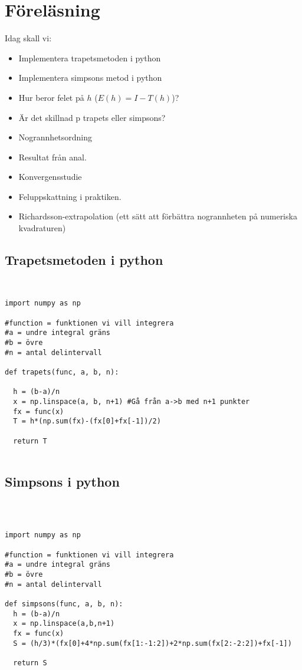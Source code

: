 \section{Föreläsning}

\noindent Idag skall vi:

\begin{itemize}
  \item Implementera trapetsmetoden i python
  \item Implementera simpsons metod i python
  \item Hur beror felet på $h$ ($E(h)=I-T(h)$)?
  \item Är det skillnad p trapets eller simpsons?
  \item Nogrannhetsordning
  \item Resultat från anal.
  \item Konvergensstudie
  \item Feluppskattning i praktiken.
  \item Richardsson-extrapolation (ett sätt att förbättra nogrannheten på numeriska kvadraturen)
\end{itemize}

\subsection{Trapetsmetoden i python}\hfill\\

\begin{verbatim}
import numpy as np

#function = funktionen vi vill integrera
#a = undre integral gräns
#b = övre
#n = antal delintervall

def trapets(func, a, b, n):

  h = (b-a)/n
  x = np.linspace(a, b, n+1) #Gå från a->b med n+1 punkter
  fx = func(x)
  T = h*(np.sum(fx)-(fx[0]+fx[-1])/2)

  return T
  
\end{verbatim}

\subsection{Simpsons i python}\hfill\\

\begin{verbatim}

import numpy as np

#function = funktionen vi vill integrera
#a = undre integral gräns
#b = övre
#n = antal delintervall

def simpsons(func, a, b, n):
  h = (b-a)/n
  x = np.linspace(a,b,n+1)
  fx = func(x)
  S = (h/3)*(fx[0]+4*np.sum(fx[1:-1:2])+2*np.sum(fx[2:-2:2])+fx[-1])

  return S


\end{verbatim}

